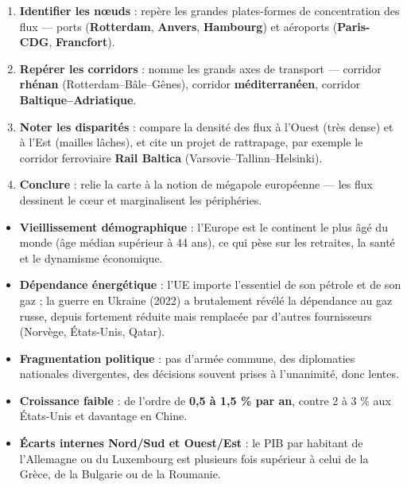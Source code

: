 \documentclass[11pt]{article}
\newcounter{popsec}
\newcounter{popsub}
\newcommand{\courssub}[1]{%
  \stepcounter{popsub}%
  \par\vspace{9pt}\noindent{\popxbold\fontsize{11.5}{13}\selectfont\color{popink}{\color{poporange}\thepopsec.\thepopsub}\hspace{6pt}#1}\par\nopagebreak\vspace{4pt}
}
\begin{document}
\begin{methode}
\begin{enumerate}
\item \textbf{Identifier les nœuds} : repère les grandes plates-formes de concentration des flux — ports (\textbf{Rotterdam}, \textbf{Anvers}, \textbf{Hambourg}) et aéroports (\textbf{Paris-CDG}, \textbf{Francfort}).
\item \textbf{Repérer les corridors} : nomme les grands axes de transport — corridor \textbf{rhénan} (Rotterdam–Bâle–Gênes), corridor \textbf{méditerranéen}, corridor \textbf{Baltique–Adriatique}.
\item \textbf{Noter les disparités} : compare la densité des flux à l'Ouest (très dense) et à l'Est (mailles lâches), et cite un projet de rattrapage, par exemple le corridor ferroviaire \textbf{Rail Baltica} (Varsovie–Tallinn–Helsinki).
\item \textbf{Conclure} : relie la carte à la notion de mégapole européenne — les flux dessinent le cœur et marginalisent les périphéries.
\end{enumerate}
\end{methode}

\courssub{Les faiblesses du géant}

\begin{itemize}
\item \textbf{Vieillissement démographique} : l'Europe est le continent le plus âgé du monde (âge médian supérieur à 44 ans), ce qui pèse sur les retraites, la santé et le dynamisme économique.
\item \textbf{Dépendance énergétique} : l'UE importe l'essentiel de son pétrole et de son gaz ; la guerre en Ukraine (2022) a brutalement révélé la dépendance au gaz russe, depuis fortement réduite mais remplacée par d'autres fournisseurs (Norvège, États-Unis, Qatar).
\item \textbf{Fragmentation politique} : pas d'armée commune, des diplomaties nationales divergentes, des décisions souvent prises à l'unanimité, donc lentes.
\item \textbf{Croissance faible} : de l'ordre de \textbf{0,5 à 1,5 \% par an}, contre 2 à 3 \% aux États-Unis et davantage en Chine.
\item \textbf{Écarts internes Nord/Sud et Ouest/Est} : le PIB par habitant de l'Allemagne ou du Luxembourg est plusieurs fois supérieur à celui de la Grèce, de la Bulgarie ou de la Roumanie.
\end{itemize}
\end{document}

